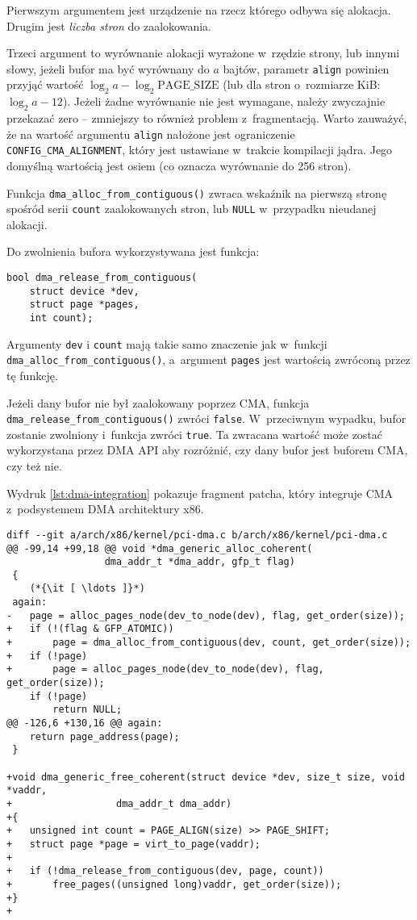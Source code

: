Pierwszym argumentem jest urządzenie na rzecz którego odbywa się
alokacja.  Drugim jest \emph{liczba stron} do zaalokowania.

Trzeci argument to wyrównanie alokacji wyrażone w~rzędzie strony, lub
innymi słowy, jeżeli bufor ma być wyrównany do $a$ bajtów, parametr
\lstinline|align| powinien przyjąć wartość $\log_2 a - \log_2
\mathrm{PAGE\_SIZE}$ (lub dla stron o~rozmiarze \unit[4096]{KiB}:
$\log_2 a - 12$).  Jeżeli żadne wyrównanie nie jest wymagane, należy
zwyczajnie przekazać zero -- zmniejszy to również problem
z~fragmentacją.  Warto zauważyć, że na wartość argumentu
\lstinline|align| nałożone jest ograniczenie
\lstinline|CONFIG_CMA_ALIGNMENT|, który jest ustawiane w~trakcie
kompilacji jądra.  Jego domyślną wartością jest osiem (co oznacza
wyrównanie do 256 stron).

Funkcja \lstinline|dma_alloc_from_contiguous()| zwraca wskaźnik na
pierwszą stronę spośród serii \lstinline|count| zaalokowanych stron,
lub \lstinline|NULL| w~przypadku nieudanej alokacji.

Do zwolnienia bufora wykorzystywana jest funkcja:

\begin{lstlisting}
bool dma_release_from_contiguous(
	struct device *dev,
	struct page *pages,
	int count);
\end{lstlisting}

Argumenty \lstinline|dev| i \lstinline|count| mają takie samo
znaczenie jak w~funkcji \lstinline|dma_alloc_from_contiguous()|,
a~argument \lstinline|pages| jest wartością zwróconą przez tę funkcję.

Jeżeli dany bufor nie był zaalokowany poprzez CMA, funkcja
\lstinline|dma_release_from_contiguous()| zwróci \lstinline|false|.
W~przeciwnym wypadku, bufor zostanie zwolniony i~funkcja zwróci
\lstinline|true|.  Ta zwracana wartość może zostać wykorzystana przez
DMA API aby rozróżnić, czy dany bufor jest buforem CMA, czy też nie.

Wydruk \ref{lst:dma-integration} pokazuje fragment patcha, który
integruje CMA z~podsystemem DMA architektury x86.

\begin{lstlisting}[float=tbhp,caption={Integracja CMA z~podsystemem DMA
      architektury x86.},label=lst:dma-integration]
diff --git a/arch/x86/kernel/pci-dma.c b/arch/x86/kernel/pci-dma.c
@@ -99,14 +99,18 @@ void *dma_generic_alloc_coherent(
 				 dma_addr_t *dma_addr, gfp_t flag)
 {
	(*{\it [ \ldots ]}*)
 again:
-	page = alloc_pages_node(dev_to_node(dev), flag, get_order(size));
+	if (!(flag & GFP_ATOMIC))
+		page = dma_alloc_from_contiguous(dev, count, get_order(size));
+	if (!page)
+		page = alloc_pages_node(dev_to_node(dev), flag, get_order(size));
 	if (!page)
 		return NULL;
@@ -126,6 +130,16 @@ again:
 	return page_address(page);
 }

+void dma_generic_free_coherent(struct device *dev, size_t size, void *vaddr,
+			       dma_addr_t dma_addr)
+{
+	unsigned int count = PAGE_ALIGN(size) >> PAGE_SHIFT;
+	struct page *page = virt_to_page(vaddr);
+
+	if (!dma_release_from_contiguous(dev, page, count))
+		free_pages((unsigned long)vaddr, get_order(size));
+}
+
\end{lstlisting}

